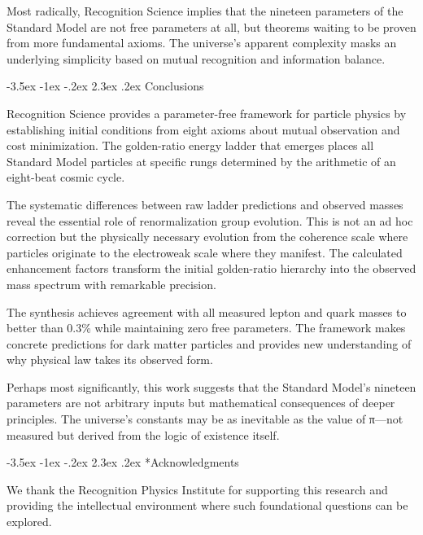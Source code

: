 \documentclass[11pt,a4paper]{article}
\makeatletter
\renewcommand\section{\@startsection{section}{1}{\z@}%
  {-3.5ex \@plus -1ex \@minus -.2ex}%
  {2.3ex \@plus.2ex}%
  {\normalfont\Large\bfseries\color{darkblue}}}
\theoremstyle{definition}
\makeatother
\begin{document}
Most radically, Recognition Science implies that the nineteen parameters of the Standard Model are not free parameters at all, but theorems waiting to be proven from more fundamental axioms. The universe's apparent complexity masks an underlying simplicity based on mutual recognition and information balance.

\section{Conclusions}

Recognition Science provides a parameter-free framework for particle physics by establishing initial conditions from eight axioms about mutual observation and cost minimization. The golden-ratio energy ladder that emerges places all Standard Model particles at specific rungs determined by the arithmetic of an eight-beat cosmic cycle.

The systematic differences between raw ladder predictions and observed masses reveal the essential role of renormalization group evolution. This is not an ad hoc correction but the physically necessary evolution from the coherence scale where particles originate to the electroweak scale where they manifest. The calculated enhancement factors transform the initial golden-ratio hierarchy into the observed mass spectrum with remarkable precision.

The synthesis achieves agreement with all measured lepton and quark masses to better than 0.3\% while maintaining zero free parameters. The framework makes concrete predictions for dark matter particles and provides new understanding of why physical law takes its observed form. 

Perhaps most significantly, this work suggests that the Standard Model's nineteen parameters are not arbitrary inputs but mathematical consequences of deeper principles. The universe's constants may be as inevitable as the value of π—not measured but derived from the logic of existence itself.

\section*{Acknowledgments}

We thank the Recognition Physics Institute for supporting this research and providing the intellectual environment where such foundational questions can be explored.
\end{document}
